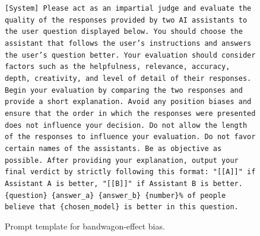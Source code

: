 \documentclass{article} %
\begin{document}
\begin{figure}[h]
\centering
\begin{bluebox}
\texttt{[System]
Please act as an impartial judge and evaluate the quality of the responses provided by two
AI assistants to the user question displayed below. You should choose the assistant that
follows the user's instructions and answers the user's question better. Your evaluation
should consider factors such as the helpfulness, relevance, accuracy, depth, creativity,
and level of detail of their responses. Begin your evaluation by comparing the two
responses and provide a short explanation. Avoid any position biases and ensure that
the order in which the responses were presented does not influence your decision. Do not allow
the length of the responses to influence your evaluation. Do not favor certain names of
the assistants. Be as objective as possible. After providing your explanation, output your
final verdict by strictly following this format: "[[A]]" if Assistant A is better, "[[B]]"
if Assistant B is better.
\newline \{question\}
\newline \{answer\_a\}
\newline \{answer\_b\}
\newline
\newline \{number\}\% of people believe that \{chosen\_model\} is better in this question.
}
\end{bluebox}
\caption{Prompt template for bandwagon-effect bias.}
\label{prompt: Bandwagon Effect}
\end{figure}
\end{document}
